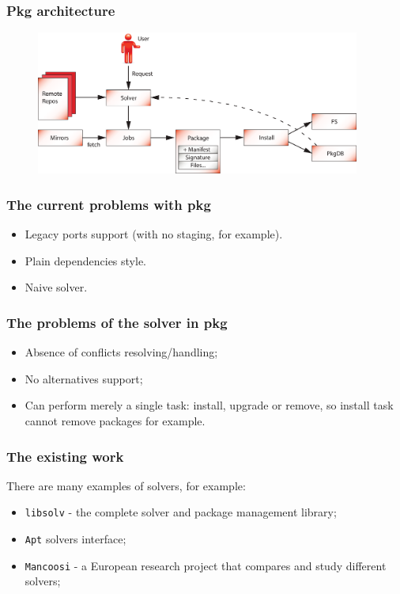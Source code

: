 \documentclass{beamer}
\begin{document}
\begin{frame}
\frametitle{Pkg architecture}
\begin{figure}[h!]
  \centering
  \includegraphics[width=0.95\textwidth]{q4.eps}
\end{figure}
\end{frame}

\begin{frame}
\frametitle{The current problems with pkg}
\begin{itemize}
  \item Legacy ports support (with no staging, for example).
  \item Plain dependencies style.
  \item Naive solver.
\end{itemize}
\end{frame}

\begin{frame}
\frametitle{The problems of the solver in pkg}

\begin{itemize}
\item Absence of conflicts resolving/handling;
\item No alternatives support;
\item Can perform merely a single task: install, upgrade or remove, 
so install task cannot remove packages for example.
\end{itemize}

\end{frame}


\begin{frame}
\frametitle{The existing work}

There are many examples of solvers, for example:
\begin{itemize}
  \item \texttt{libsolv} - the complete solver and package management library;
  \item \texttt{Apt} solvers interface;
  \item \texttt{Mancoosi} - a European research project that compares and study
  different solvers;
\end{itemize}

\end{frame}
\end{document}
